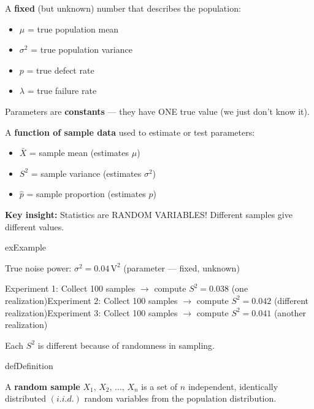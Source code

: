 
A \textbf{fixed} (but unknown) number that describes the population:

\begin{itemize}
\tightlist
\item
  $\mu$ = true population mean
\item
  $\sigma^{2}$ = true population variance
\item
  $p$ = true defect rate
\item
  $\lambda$ = true failure rate
\end{itemize}

Parameters are \textbf{constants} — they have ONE true value (we just don’t know it).


A \textbf{function of sample data} used to estimate or test parameters:

\begin{itemize}
\tightlist
\item
  $\bar{X}$ = sample mean (estimates $\mu$)
\item
  $S^{2}$ = sample variance (estimates $\sigma^{2}$)
\item
  $\hat{p}$ = sample proportion (estimates $p$)
\end{itemize}

\begin{PSquote}

\PSwarn{} \textbf{Key insight:} Statistics are RANDOM VARIABLES! Different samples give different values.

\end{PSquote}

\begin{PSbox}[unbreakable]{ex}{Example}

True noise power: $\sigma^{2} = 0.04\,\mathrm{V}^{2}$ (parameter — fixed, unknown)

Experiment 1: Collect 100 samples \ensuremath{\to} compute $S^{2} = 0.038$ (one realization)\PSbr{}Experiment 2: Collect 100 samples \ensuremath{\to} compute $S^{2} = 0.042$ (different realization)\PSbr{}Experiment 3: Collect 100 samples \ensuremath{\to} compute $S^{2} = 0.041$ (another realization)

Each $S^{2}$ is different because of randomness in sampling.

\end{PSbox}


\begin{PSbox}[unbreakable]{def}{Definition}

A \textbf{random sample} $X_{1},\, X_{2},\, \ldots,\, X_{n}$ is a set of $n$ independent, identically distributed $(i.i.d.)$ random variables from the population distribution.

\end{PSbox}

